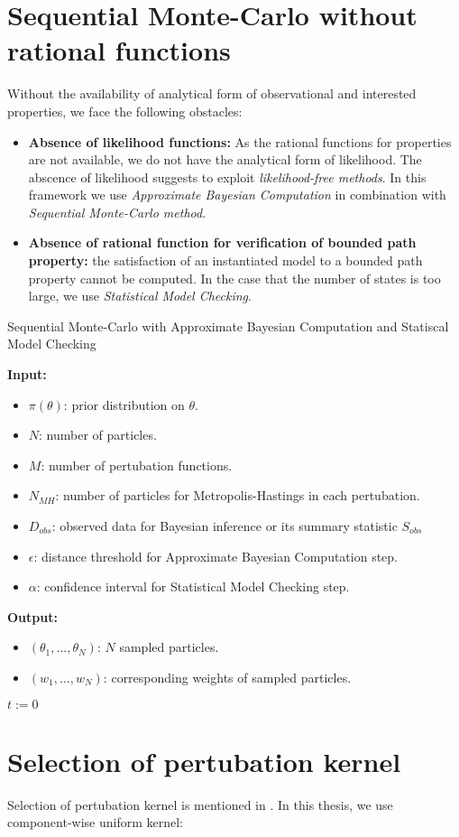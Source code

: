 \section{Sequential Monte-Carlo without rational functions}
Without the availability of analytical form of observational and interested properties, we face the
following obstacles:
\begin{itemize}
    \item \textbf{Absence of likelihood functions:} As the rational functions for properties are not
    available, we do not have the analytical form of likelihood. The abscence of likelihood suggests
    to exploit \textit{likelihood-free methods}. In this framework we use \textit{Approximate
    Bayesian Computation} in combination with \textit{Sequential Monte-Carlo method}.
    \item \textbf{Absence of rational function for verification of bounded path property:} the
    satisfaction of an instantiated model to a bounded path property cannot be computed. In the case
    that the number of states is too large, we use \textit{Statistical Model Checking}.
\end{itemize}


\begin{algorithm}[H]
    \caption{Sequential Monte-Carlo with Approximate Bayesian Computation and Statiscal Model Checking}
    \label{smcabcsmc-alg}
    \hspace*{\algorithmicindent} \textbf{Input:}
    \begin{itemize}
        \item $\pi(\theta)$: prior distribution on $\theta$.
        \item $N$: number of particles.
        \item $M$: number of pertubation functions.
        \item $N_{MH}$: number of particles for Metropolis-Hastings in each pertubation.
        \item $D_{obs}$: observed data for Bayesian inference or its summary statistic $S_{obs}$
        \item $\epsilon$: distance threshold for Approximate Bayesian Computation step.
        \item $\alpha$: confidence interval for Statistical Model Checking step.
    \end{itemize}
    \hspace*{\algorithmicindent} \textbf{Output:}
    \begin{itemize}
        \item $(\theta_1,\ldots,\theta_N)$: $N$ sampled particles.
        \item $(w_1,\ldots,w_N)$: corresponding weights of sampled particles.
    \end{itemize}
    \begin{algorithmic}[1]
        \State $t:=0$
        \EndWhile
        \EndProcedure
    \end{algorithmic}
\end{algorithm}

\section{Selection of pertubation kernel}
Selection of pertubation kernel is mentioned in \cite{filippi2013optimality}. In this thesis, we use
component-wise uniform kernel:

